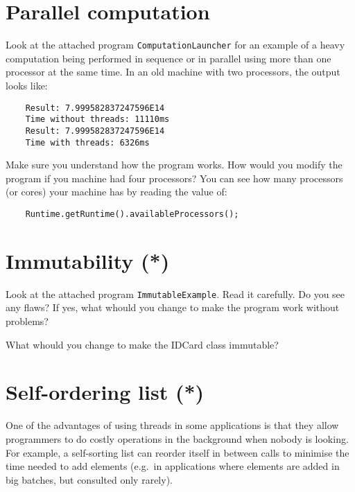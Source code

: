 \documentclass{article}
\begin{document}
\section{Parallel computation}
\label{sec:parallel-computation}

% 

Look at the attached program \verb+ComputationLauncher+ for an example
of a heavy computation being performed in sequence or in parallel
using more than one processor at the same time. In an old machine with
two processors, the output looks like: 

\begin{verbatim}
    Result: 7.999582837247596E14
    Time without threads: 11110ms
    Result: 7.999582837247596E14
    Time with threads: 6326ms
\end{verbatim}

Make sure you understand how the program works. How would you modify
the program if you machine had four processors? You can see how many
processors (or cores) your machine has by reading the value of: 

\begin{verbatim}
    Runtime.getRuntime().availableProcessors();
\end{verbatim}

\section{Immutability (*)}
\label{sec:immutability}

Look at the attached program \verb+ImmutableExample+. Read it
carefully. Do you see any flaws? If yes, what whould you change to
make the program work without problems?

What whould you change to make the IDCard class immutable?

\section{Self-ordering list (*)}
\label{sec:self-ordering-list}

One of the advantages of using threads in some applications is that
they allow programmers to do costly operations in the background when
nobody is looking. For example, a self-sorting list can reorder itself
in between calls to minimise the time needed to add elements (e.g.~in
applications where elements are added in big batches, but consulted
only rarely).
\end{document}
